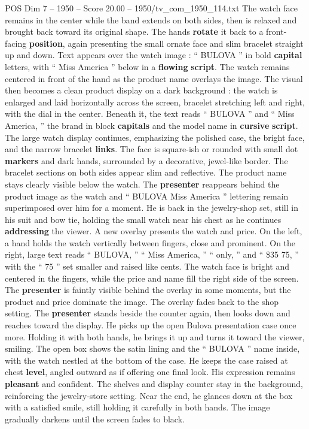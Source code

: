 \begin{textsample}{POS Dim 7 – 1950 – Score 20.00 – 1950/tv\_com\_1950\_114.txt}
The watch face remains in the center while the band extends on both sides, then is relaxed and brought back toward its original shape.
The hands \textbf{rotate} it back to a front-facing \textbf{position}, again presenting the small ornate face and slim bracelet straight up and down.
Text appears over the watch image : “ BULOVA ” in bold \textbf{capital} letters, with “ Miss America ” below in a \textbf{flowing} \textbf{script}.
The watch remains centered in front of the hand as the product name overlays the image.
The visual then becomes a clean product display on a dark background : the watch is enlarged and laid horizontally across the screen, bracelet stretching left and right, with the dial in the center.
Beneath it, the text reads “ BULOVA ” and “ Miss America, ” the brand in block \textbf{capitals} and the model name in \textbf{cursive} \textbf{script}.
The large watch display continues, emphasizing the polished case, the bright face, and the narrow bracelet \textbf{links}.
The face is square-ish or rounded with small dot \textbf{markers} and dark hands, surrounded by a decorative, jewel-like border.
The bracelet sections on both sides appear slim and reflective.
The product name stays clearly visible below the watch.
The \textbf{presenter} reappears behind the product image as the watch and “ BULOVA Miss America ” lettering remain superimposed over him for a moment.
He is back in the jewelry-shop set, still in his suit and bow tie, holding the small watch near his chest as he continues \textbf{addressing} the viewer.
A new overlay presents the watch and price.
On the left, a hand holds the watch vertically between fingers, close and prominent.
On the right, large text reads “ BULOVA, ” “ Miss America, ” “ only, ” and “ \$35 75, ” with the “ 75 ” set smaller and raised like cents.
The watch face is bright and centered in the fingers, while the price and name fill the right side of the screen.
The \textbf{presenter} is faintly visible behind the overlay in some moments, but the product and price dominate the image.
The overlay fades back to the shop setting.
The \textbf{presenter} stands beside the counter again, then looks down and reaches toward the display.
He picks up the open Bulova presentation case once more.
Holding it with both hands, he brings it up and turns it toward the viewer, smiling.
The open box shows the satin lining and the “ BULOVA ” name inside, with the watch nestled at the bottom of the case.
He keeps the case raised at chest \textbf{level}, angled outward as if offering one final look.
His expression remains \textbf{pleasant} and confident.
The shelves and display counter stay in the background, reinforcing the jewelry-store setting.
Near the end, he glances down at the box with a satisfied smile, still holding it carefully in both hands.
The image gradually darkens until the screen fades to black.

\end{textsample}
